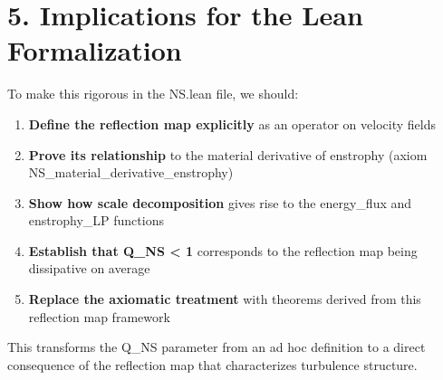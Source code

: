 \documentclass[11pt]{article}
\begin{document}
\section{5. Implications for the Lean Formalization}

To make this rigorous in the NS.lean file, we should:

\begin{enumerate}
\item \textbf{Define the reflection map explicitly} as an operator on velocity fields
\item \textbf{Prove its relationship} to the material derivative of enstrophy (axiom NS_material_derivative_enstrophy)
\item \textbf{Show how scale decomposition} gives rise to the energy_flux and enstrophy_LP functions
\item \textbf{Establish that Q_{NS} < 1} corresponds to the reflection map being dissipative on average
\item \textbf{Replace the axiomatic treatment} with theorems derived from this reflection map framework
\end{enumerate}

This transforms the Q_{NS} parameter from an ad hoc definition to a direct consequence of the reflection map that characterizes turbulence structure.
\end{document}
